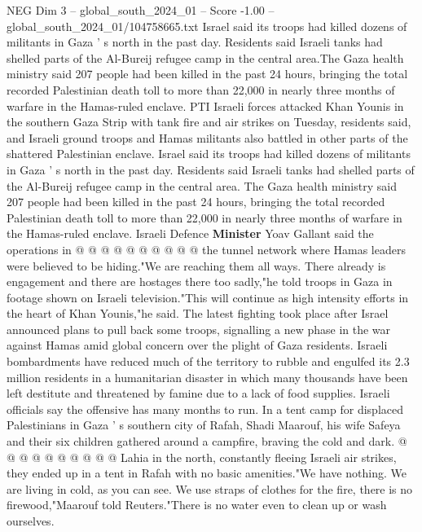 \begin{textsample}{NEG Dim 3 – global\_south\_2024\_01 – Score -1.00 – global\_south\_2024\_01/104758665.txt}  \label{ex:f3_neg_074}
Israel said its troops had killed dozens of militants in Gaza ' s north in the past day.
Residents said Israeli tanks had shelled parts of the Al-Bureij refugee camp in the central area.The Gaza health ministry said 207 people had been killed in the past 24 hours, bringing the total recorded Palestinian death toll to more than 22,000 in nearly three months of warfare in the Hamas-ruled enclave.
PTI Israeli forces attacked Khan Younis in the southern Gaza Strip with tank fire and air strikes on Tuesday, residents said, and Israeli ground troops and Hamas militants also battled in other parts of the shattered Palestinian enclave.
Israel said its troops had killed dozens of militants in Gaza ' s north in the past day.
Residents said Israeli tanks had shelled parts of the Al-Bureij refugee camp in the central area.
The Gaza health ministry said 207 people had been killed in the past 24 hours, bringing the total recorded Palestinian death toll to more than 22,000 in nearly three months of warfare in the Hamas-ruled enclave.
Israeli Defence \textbf{Minister} Yoav Gallant said the operations in @ @ @ @ @ @ @ @ @ @ the tunnel network where Hamas leaders were believed to be hiding."We are reaching them all ways.
There already is engagement and there are hostages there too sadly,"he told troops in Gaza in footage shown on Israeli television."This will continue as high intensity efforts in the heart of Khan Younis,"he said.
The latest fighting took place after Israel announced plans to pull back some troops, signalling a new phase in the war against Hamas amid global concern over the plight of Gaza residents.
Israeli bombardments have reduced much of the territory to rubble and engulfed its 2.3 million residents in a humanitarian disaster in which many thousands have been left destitute and threatened by famine due to a lack of food supplies.
Israeli officials say the offensive has many months to run.
In a tent camp for displaced Palestinians in Gaza ' s southern city of Rafah, Shadi Maarouf, his wife Safeya and their six children gathered around a campfire, braving the cold and dark. @ @ @ @ @ @ @ @ @ @ Lahia in the north, constantly fleeing Israeli air strikes, they ended up in a tent in Rafah with no basic amenities."We have nothing.
We are living in cold, as you can see.
We use straps of clothes for the fire, there is no firewood,"Maarouf told Reuters."There is no water even to clean up or wash ourselves.

\end{textsample}
